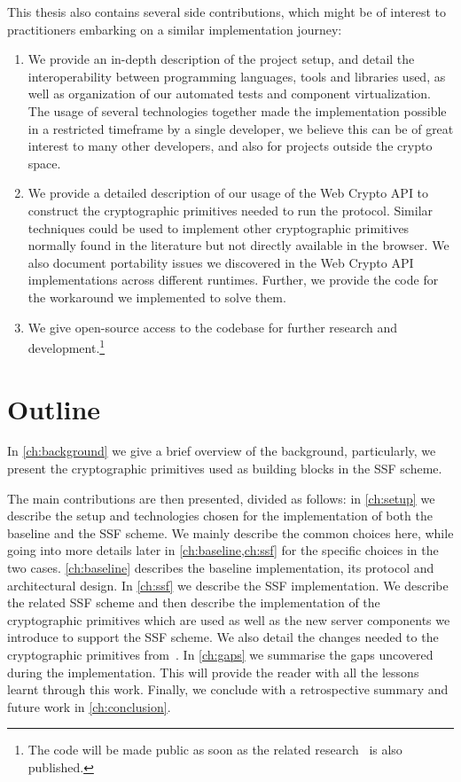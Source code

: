 This thesis also contains several side contributions, 
which might be of interest to
practitioners embarking on a similar implementation journey:
\begin{enumerate}
    \item We provide an in-depth description of the project 
    setup, and detail the interoperability between programming
    languages, tools and libraries used, as well as 
    organization of our automated tests and component 
    virtualization. The usage of several technologies 
    together made the implementation possible in a 
    restricted timeframe by a single developer, 
    we believe this can be of great interest to many other 
    developers, and also for projects outside the crypto space.
    \item We provide a detailed description of our usage of 
    the Web Crypto API to construct the cryptographic 
    primitives needed to run the protocol. 
    Similar techniques could be used to implement other 
    cryptographic primitives normally found in the 
    literature but not directly available in the browser. 
    We also document portability issues we discovered
    in the Web Crypto API implementations across different 
    runtimes. Further, we provide the code for the workaround 
    we implemented to solve them.
    \item We give open-source access to the codebase for 
    further research and development.\footnote{The code will be made public as soon as the related research~\cite{GKP} is also published.}
\end{enumerate}

\section{Outline}\label{sc:outline}

In \cref{ch:background} we give a brief overview of the background, particularly,
we present the cryptographic primitives used as building blocks in the SSF scheme. 

The main contributions are then presented, divided as follows: 
in \cref{ch:setup} we describe the setup and technologies 
chosen for the implementation of both the baseline and 
the SSF scheme. We mainly describe the common choices here,
while going into more details later 
in \cref{ch:baseline,ch:ssf} for the specific choices 
in the two cases.
\cref{ch:baseline} describes the baseline implementation, 
its protocol and architectural design.
In \cref{ch:ssf} we describe the SSF implementation. 
We describe the related SSF scheme and then 
describe the implementation of the cryptographic
primitives which are used as well as the new server components
we introduce to support the SSF scheme. We
also detail the changes needed to the cryptographic primitives
from~\cite{GKP}.
In \cref{ch:gaps} we summarise the gaps uncovered during 
the implementation. This will provide the reader with 
all the lessons learnt through this work.
Finally, we conclude with a retrospective summary
and future work in \cref{ch:conclusion}.

